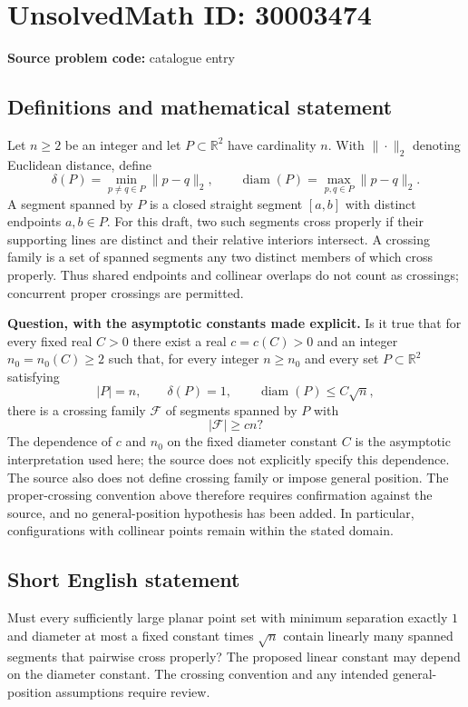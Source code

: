 \documentclass[11pt]{article}
\newcommand{\R}{\mathbb{R}}
\begin{document}
\section*{UnsolvedMath ID: 30003474}
\textbf{Source problem code:} catalogue entry
\subsection{Definitions and mathematical statement}
Let \(n\ge 2\) be an integer and let \(P\subset\R^2\) have cardinality \(n\). With \(\|\cdot\|_2\) denoting Euclidean distance, define
\[
\delta(P)=\min_{p\ne q\in P}\|p-q\|_2,
\qquad
\operatorname{diam}(P)=\max_{p,q\in P}\|p-q\|_2.
\]
A segment spanned by \(P\) is a closed straight segment \([a,b]\) with distinct endpoints \(a,b\in P\). For this draft, two such segments cross properly if their supporting lines are distinct and their relative interiors intersect. A crossing family is a set of spanned segments any two distinct members of which cross properly. Thus shared endpoints and collinear overlaps do not count as crossings; concurrent proper crossings are permitted.

\textbf{Question, with the asymptotic constants made explicit.} Is it true that for every fixed real \(C>0\) there exist a real \(c=c(C)>0\) and an integer \(n_0=n_0(C)\ge 2\) such that, for every integer \(n\ge n_0\) and every set \(P\subset\R^2\) satisfying
\[
|P|=n,\qquad \delta(P)=1,\qquad \operatorname{diam}(P)\le C\sqrt n,
\]
there is a crossing family \(\mathcal F\) of segments spanned by \(P\) with
\[
|\mathcal F|\ge cn?
\]
The dependence of \(c\) and \(n_0\) on the fixed diameter constant \(C\) is the asymptotic interpretation used here; the source does not explicitly specify this dependence. The source also does not define crossing family or impose general position. The proper-crossing convention above therefore requires confirmation against the source, and no general-position hypothesis has been added. In particular, configurations with collinear points remain within the stated domain.
\subsection{Short English statement}
Must every sufficiently large planar point set with minimum separation exactly \(1\) and diameter at most a fixed constant times \(\sqrt n\) contain linearly many spanned segments that pairwise cross properly? The proposed linear constant may depend on the diameter constant. The crossing convention and any intended general-position assumptions require review.
\end{document}
